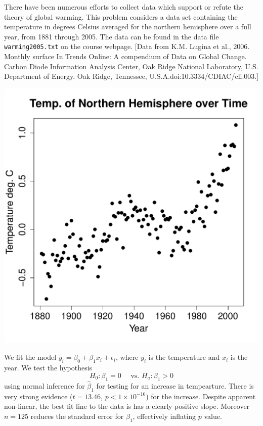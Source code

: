 \documentclass{homework}
\begin{document}
\begin{longproblem}
  There have been numerous efforts to collect data which support or refute the theory of global warming.  This problem considers a data set containing the temperature in degrees Celsius averaged for the northern hemisphere over a full year, from 1881 through 2005.  The data can be found in the data file \texttt{warming2005.txt} on the course webpage. [Data from K.M. Lugina et al., 2006. Monthly surface In Trends Online:  A compendium of Data on Global Change.  Carbon Diode Information Analysis Center, Oak Ridge National Laboratory, U.S. Department of Energy.  Oak Ridge, Tennessee, U.S.A.doi:10.3334/CDIAC/cli.003.]
  

\begin{minipage}{.4\textwidth}
  \includegraphics[width=\textwidth]{time_plot4.pdf}
\end{minipage}
\begin{minipage}{.6\textwidth}
  We fit the model $y_i = \beta_0 + \beta_1 x_i + \epsilon_i$, where $y_i$ is the temperature and $x_i$ is the year. We test the hypothesis $$
  H_0:\beta_1 = 0\quad\text{ vs. }H_a:\beta_1 > 0
$$
using normal inference for $\hat \beta_1$ for testing for an increase in tempearture. There is very strong evidence ($t = 13.46$, $p < 1\times10^{-16}$)  for the increase.  Despite apparent non-linear, the best fit line to the data is has a clearly positive slope.  Moreover $n=125$ reduces the standard error for $\beta_1$, effectively inflating $p$ value.
\end{minipage}


\end{longproblem}
\end{document}
